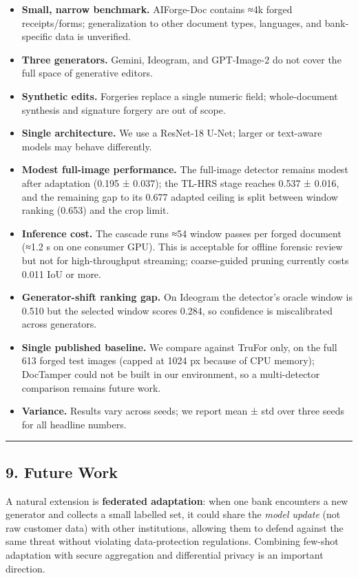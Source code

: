 \begin{itemize}
\tightlist
\item
  \textbf{Small, narrow benchmark.} AIForge-Doc contains ≈4k forged receipts/forms; generalization to other document types, languages, and bank-specific data is unverified.
\item
  \textbf{Three generators.} Gemini, Ideogram, and GPT-Image-2 do not cover the full space of generative editors.
\item
  \textbf{Synthetic edits.} Forgeries replace a single numeric field; whole-document synthesis and signature forgery are out of scope.
\item
  \textbf{Single architecture.} We use a ResNet-18 U-Net; larger or text-aware models may behave differently.
\item
  \textbf{Modest full-image performance.} The full-image detector remains modest after adaptation (0.195 ± 0.037); the TL-HRS stage reaches 0.537 ± 0.016, and the remaining gap to its 0.677 adapted ceiling is split between window ranking (0.653) and the crop limit.
\item
  \textbf{Inference cost.} The cascade runs ≈54 window passes per forged document (≈1.2 s on one consumer GPU). This is acceptable for offline forensic review but not for high-throughput streaming; coarse-guided pruning currently costs 0.011 IoU or more.
\item
  \textbf{Generator-shift ranking gap.} On Ideogram the detector's oracle window is 0.510 but the selected window scores 0.284, so confidence is miscalibrated across generators.
\item
  \textbf{Single published baseline.} We compare against TruFor only, on the full 613 forged test images (capped at 1024 px because of CPU memory); DocTamper could not be built in our environment, so a multi-detector comparison remains future work.
\item
  \textbf{Variance.} Results vary across seeds; we report mean ± std over three seeds for all headline numbers.
\end{itemize}

\begin{center}\rule{0.5\linewidth}{0.5pt}\end{center}

\subsection{9. Future Work}\label{future-work}

A natural extension is \textbf{federated adaptation}: when one bank encounters a new generator and collects a small labelled set, it could share the \emph{model update} (not raw customer data) with other institutions, allowing them to defend against the same threat without violating data-protection regulations. Combining few-shot adaptation with secure aggregation and differential privacy is an important direction.

